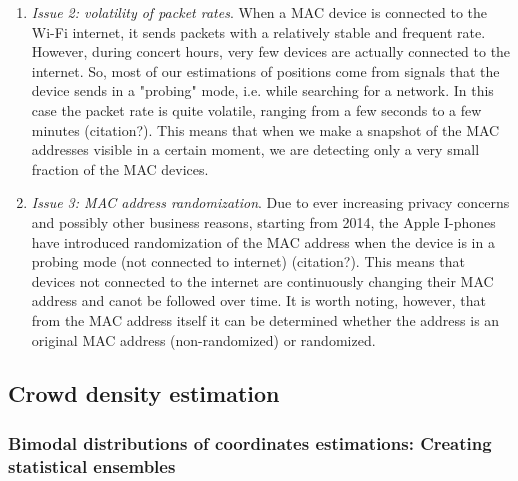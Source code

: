 \documentclass[10pt,a4paper]{article}
\begin{document}
\begin{enumerate}
	
\item {\it Issue 2: volatility of packet rates}. When a MAC device is connected to the Wi-Fi internet, it sends packets with a relatively stable and frequent rate. However, during concert hours, very few devices are actually connected to the internet. So, most of our estimations of positions come from signals that the device sends in a "probing" mode, i.e. while searching for a network. In this case the packet rate is quite volatile, ranging from a few seconds to a few minutes (citation?). This means that when we make a snapshot of the MAC addresses visible in a certain moment, we are detecting only a very small fraction of the MAC devices.   

\item {\it Issue 3: MAC address randomization}. Due to ever increasing privacy concerns and possibly other business reasons, starting from 2014, the Apple I-phones have introduced randomization of the MAC address when the device is in a probing mode (not connected to internet) (citation?). This means that devices not connected to the internet are continuously changing their MAC address and canot be followed over time.  It is worth noting, however, that from the MAC address itself it can be determined whether the address is an original MAC address (non-randomized) or randomized. 
\end{enumerate}


\subsection{Crowd density estimation}

\subsubsection{Bimodal distributions of coordinates estimations: Creating statistical ensembles}
\end{document}
